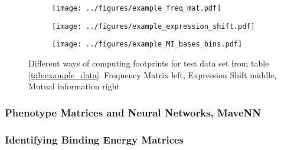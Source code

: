 \begin{figure}
    \centering
    \begin{subfigure}[b]{0.3\textwidth}
        \texttt{[image: ../figures/example\_freq\_mat.pdf]}
    \end{subfigure}
    \hfill
    \begin{subfigure}[b]{0.3\textwidth}
        \centering
        \texttt{[image: ../figures/example\_expression\_shift.pdf]}
    \end{subfigure}
    \hfill
    \begin{subfigure}[b]{0.3\textwidth}
        \texttt{[image: ../figures/example\_MI\_bases\_bins.pdf]}
    \end{subfigure}
    \caption{Different ways of computing footprints for test data set from table \ref{tab:example_data}. Frequency Matrix left, Expression Shift middle, Mutual information right}
\end{figure}

\subsubsection{Phenotype Matrices and Neural Networks, MaveNN}
\subsubsection{Identifying Binding Energy Matrices}